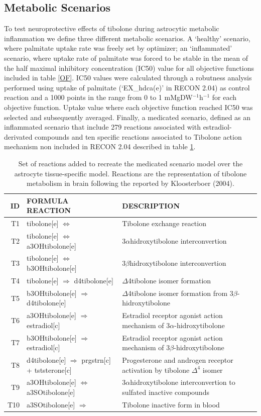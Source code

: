 \subsection*{Metabolic Scenarios}
To test neuroprotective effects of tibolone during astrocytic metabolic inflammation we define three different metabolic scenarios. A `healthy' scenario, where palmitate uptake rate was freely set by optimizer; an `inflammated' scenario, where uptake rate of palmitate was forced to be stable in the mean of the half maximal inhibitory concentration (IC50) value for all objective functions included in table \ref{OF}. IC50 values were calculated through a robutness analysis performed using uptake of palmitate (`EX\_hdca(e)' in RECON 2.04) as control reaction and a 1000 points in the range from 0 to 1 mMgDW$^{-1}$h$^{-1}$ for each objective function. Uptake value where each objective function reached IC50 was selected and subsequently averaged. Finally, a medicated scenario, defined as an inflammated scenario that include 279 reactions associated with estradiol-derivated compounds and ten specific reactions associated to Tibolone action mechanism non included in RECON 2.04 described in table \ref{Tibolone}.
\begin{table}[h]
\caption{Set of reactions added to recreate the medicated scenario model over the astrocyte tissue-specific model. Reactions are the representation of tibolone metabolism in brain following the reported by Kloosterboer (2004).}
\label{Tibolone}
\begin{center}
\begin{tabular}{rlm{7cm}}
\hline
ID & FORMULA REACTION & DESCRIPTION \\
\hline
\hline
T1 & tibolone[e] $\Leftrightarrow$ & Tibolone exchange reaction\\
T2 & tibolone[e] $\Leftrightarrow$ a3OHtibolone[e] & 3$\alpha$hidroxytibolone interconvertion\\
T3 & tibolone[e] $\Leftrightarrow$ b3OHtibolone[e] & 3$\beta$hidroxytibolone interconvertion \\
T4 & tibolone[e] $\Rightarrow$ d4tibolone[e] & $\Delta$4tibolone isomer formation \\
T5 & b3OHtibolone[e] $\Rightarrow$ d4tibolone[e] &  $\Delta$4tibolone isomer formation from 3$\beta$-hidroxytibolone \\
T6 & a3OHtibolone[e] $\Rightarrow$ estradiol[c] & Estradiol receptor agonist action mechanism of 3$\alpha$-hidroxytibolone\\
T7 & b3OHtibolone[e] $\Rightarrow$ estradiol[c] & Estradiol receptor agonist action mechanism of 3$\beta$-hidroxytibolone\\
T8 & d4tibolone[e] $\Rightarrow$ prgstrn[c] + tststerone[c] & Progesterone and androgen receptor activation by tibolone $\Delta^4$ isomer\\
T9 & a3OHtibolone[e] $\Leftrightarrow$ a3SOtibolone[e] & 3$\alpha$hidroxytibolone interconvertion to sulfated inactive compounds \\
T10 & a3SOtibolone[e] $\Rightarrow$ & Tibolone inactive form in blood \\ 
\hline
\end{tabular}
\end{center}
\end{table} 
